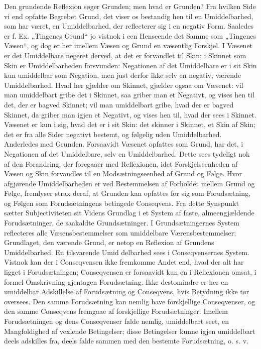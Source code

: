 \documentclass[11pt]{book}
\newcommand{\opage}[1]{\marginnote{\footnotesize\textit{[#1]}}}
\begin{document}
\opage{86} \setcounter{footnote}{0}%
Den grundende Reflexion søger Grunden; men hvad er
Grunden? Fra hvilken Side vi end opfatte Begrebet Grund,
det viser os bestandig hen til en Umiddelbarhed, som har
været, en Umiddelbarhed, der reflecterer sig i en negativ Form.
Saaledes er f. Ex. „Tingenes Grund“ jo vistnok i een
Henseende det Samme som „Tingenes Væsen“, og dog er her
imellem Væsen og Grund en væsentlig Forskjel. I Væsenet er
det Umiddelbare negeret derved, at det er forvandlet til Skin;
i Skinnet som Skin er Umiddelbarheden forsvunden:
Negationen af det Umiddelbare er i sit Skin kun umiddelbar
som Negation, men just derfor ikke selv en negativ, værende
Umiddelbarhed. Hvad her gjælder om Skinnet, gjælder ogsaa
om Væsenet: vil man umiddelbart gribe det i Skinnet, saa
griber man et Negativt, og vises hen til det, der er bagved
Skinnet; vil man umiddelbart gribe, hvad der er bagved
Skinnet, da griber man igjen et Negativt, og vises hen til,
hvad der sees i Skinnet. Væsenet er kun i sig, hvad det er i
sit Skin: det skinner i Skinnet, et Skin af Skin; det er fra
alle Sider negativt bestemt, og følgelig uden Umiddelbarhed.
Anderledes med Grunden. Forsaavidt Væsenet opfattes som
Grund, har det, i Negationen af det Umiddelbare, selv en
Umiddelbarhed. Dette sees tydeligt nok af den Forandring,
der foregaaer med Reflexionen, idet Forskjelseenheden af Væsen
og Skin forvandles til en Modsætningseenhed af Grund og
Følge. Hvor afgjørende Umiddelbarheden er ved Bestemmelsen
af Forholdet mellem Grund og Følge, fremlyser strax deraf, at
Grunden kan opfattes for sig som Forudsætning, og Følgen
som Forudsætningens betingede Conseqvens. Fra dette
Synspunkt sætter Subjectiviteten sit Videns Grundlag i et
System af faste, almeengjældende Forudsætninger, de saakaldte
Grundsætninger. I Grundsætningernes System reflecteres alle
Væsensbestemmelser som umiddelbare Værensbestemmelser;
Grundlaget, den værende Grund, er netop en Reflexion af
Grundens Umiddelbarhed. En tilsvarende Umid\-%
\opage{87} \setcounter{footnote}{0}%
delbarhed sees i Conseqvensernes System. Vistnok kan der i
Conseqvensen ikke fremkomme Andet end, hvad der alt har
ligget i Forudsætningen; Conseqvensen er forsaavidt kun en i
Reflexionen omsat, i formel Omskrivning gjentagen
Forudsætning. Ikke destomindre er her en umiddelbar
Adskillelse af Forudsætning og Conseqvens, hvis Betydning
ikke tør oversees. Den samme Forudsætning kan nemlig have
forskjellige Conseqvenser, og den samme Conseqvens fremgaae
af forskjellige Forudsætninger. Imellem Forudsætningen og
dens Conseqvenser falde nemlig, umiddelbart seet, en
Mangfoldighed af vexlende Betingelser; disse Betingelser kunne
igjen umiddelbart deels adskilles fra, deels falde sammen med
den bestemte Forudsætning, o. s. v.
\end{document}

